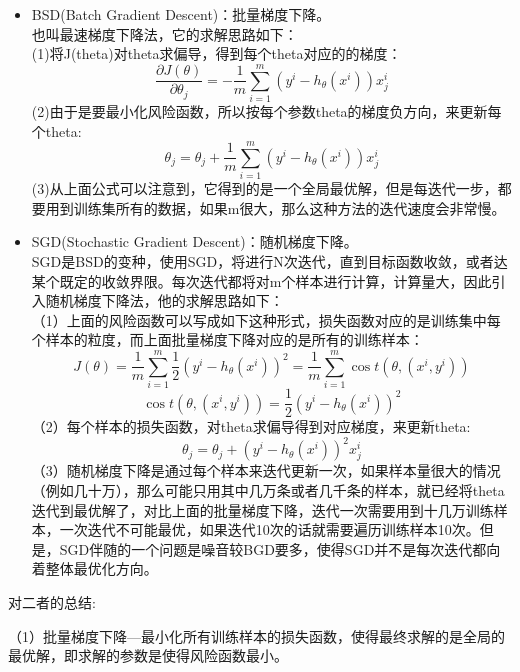 \begin{itemize}
\item BSD(Batch Gradient Descent)：批量梯度下降。~\\
也叫最速梯度下降法，它的求解思路如下：\\
(1)将J(theta)对theta求偏导，得到每个theta对应的的梯度：
\begin{displaymath}
\frac{\partial J(\theta)}{\partial {\theta_j}} =-\frac{1}{m}\sum_{i=1}^m(y^i-h_{\theta}(x^i))x^i_j
\end{displaymath}
(2)由于是要最小化风险函数，所以按每个参数theta的梯度负方向，来更新每个theta:
\begin{displaymath}
\theta_j=\theta_j+\frac{1}{m}\sum_{i=1}^m(y^i-h_{\theta}(x^i))x^i_j
\end{displaymath}
(3)从上面公式可以注意到，它得到的是一个全局最优解，但是每迭代一步，都要用到训练集所有的数据，如果m很大，那么这种方法的迭代速度会非常慢。
\item SGD(Stochastic Gradient Descent)：随机梯度下降。~\\
SGD是BSD的变种，使用SGD，将进行N次迭代，直到目标函数收敛，或者达某个既定的收敛界限。每次迭代都将对m个样本进行计算，计算量大，因此引入随机梯度下降法，他的求解思路如下：\\
（1）上面的风险函数可以写成如下这种形式，损失函数对应的是训练集中每个样本的粒度，而上面批量梯度下降对应的是所有的训练样本：
\begin{displaymath}
J(\theta)=\frac{1}{m}\sum_{i=1}^{m}\frac{1}{2}(y^i-h_{\theta}(x^i))^2=\frac{1}{m}\sum_{i=1}^{m}\cos t(\theta,(x^i,y^i))
\end{displaymath}
\begin{displaymath}
\cos t(\theta,(x^i,y^i))=\frac{1}{2}(y^i-h_{\theta}(x^i))^2
\end{displaymath}
（2）每个样本的损失函数，对theta求偏导得到对应梯度，来更新theta:
\begin{displaymath}
\theta_j=\theta_j+(y^i-h_{\theta}(x^i))^2{x^i_j}
\end{displaymath}
（3）随机梯度下降是通过每个样本来迭代更新一次，如果样本量很大的情况（例如几十万），那么可能只用其中几万条或者几千条的样本，就已经将theta迭代到最优解了，对比上面的批量梯度下降，迭代一次需要用到十几万训练样本，一次迭代不可能最优，如果迭代10次的话就需要遍历训练样本10次。但是，SGD伴随的一个问题是噪音较BGD要多，使得SGD并不是每次迭代都向着整体最优化方向。
\end{itemize}

对二者的总结:

（1）批量梯度下降---最小化所有训练样本的损失函数，使得最终求解的是全局的最优解，即求解的参数是使得风险函数最小。

